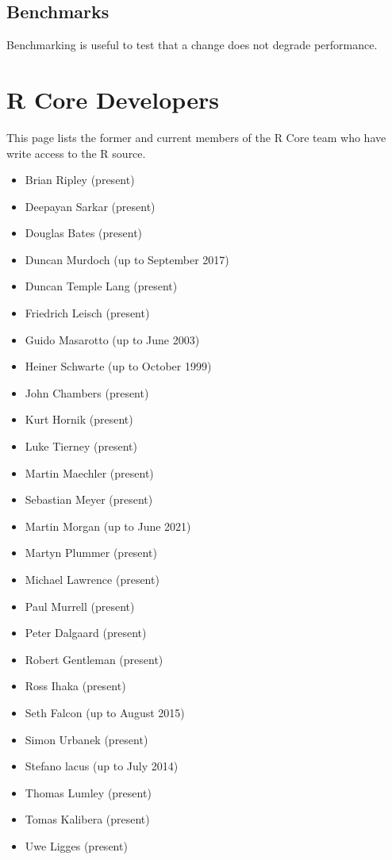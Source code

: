 \documentclass[
]{book}
\providecommand{\tightlist}{%
  \setlength{\itemsep}{0pt}\setlength{\parskip}{0pt}}
\begin{document}
\hypertarget{benchmarks}{%
\section{Benchmarks}\label{benchmarks}}

Benchmarking is useful to test that a change does not degrade performance.

\hypertarget{CoreDev}{%
\chapter{R Core Developers}\label{CoreDev}}

This page lists the former and current members of the R Core team who have write access to the R source.

\begin{itemize}
\tightlist
\item
  Brian Ripley (present)
\item
  Deepayan Sarkar (present)
\item
  Douglas Bates (present)
\item
  Duncan Murdoch (up to September 2017)
\item
  Duncan Temple Lang (present)
\item
  Friedrich Leisch (present)
\item
  Guido Masarotto (up to June 2003)
\item
  Heiner Schwarte (up to October 1999)
\item
  John Chambers (present)
\item
  Kurt Hornik (present)
\item
  Luke Tierney (present)
\item
  Martin Maechler (present)
\item
  Sebastian Meyer (present)
\item
  Martin Morgan (up to June 2021)
\item
  Martyn Plummer (present)
\item
  Michael Lawrence (present)
\item
  Paul Murrell (present)
\item
  Peter Dalgaard (present)
\item
  Robert Gentleman (present)
\item
  Ross Ihaka (present)
\item
  Seth Falcon (up to August 2015)
\item
  Simon Urbanek (present)
\item
  Stefano lacus (up to July 2014)
\item
  Thomas Lumley (present)
\item
  Tomas Kalibera (present)
\item
  Uwe Ligges (present)
\end{itemize}
\end{document}
